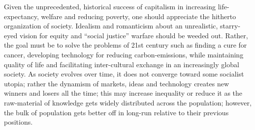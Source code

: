 \documentclass[12pt]{article}
\newcommand{\1}{\mathbbm 1}
\begin{document}
		Given the unprecedented, historical success of capitalism in increasing life-expectancy, welfare and reducing poverty, one should appreciate the hitherto organization of society. Idealism and romanticism about an unrealistic, starry-eyed vision for equity and ``social justice'' warfare should be weeded out. Rather, the goal must be to solve the problems of 21st century such as finding a cure for cancer, developing technology for reducing carbon-emissions, while maintaining quality of life and facilitating inter-cultural exchange in an increasingly global society. As society evolves over time, it does not converge toward some socialist utopia; rather the dynamism of markets, ideas and technology creates new winners and losers all the time; this may increase inequality or reduce it as the raw-material of knowledge gets widely distributed across the population; however, the bulk of population gets better off in long-run relative to their previous positions.
	
		\newpage
		
		

		\singlespacing
		
		
		\clearpage
		
		
		
		
		
		
		\newpage
		
		
		
		
		
		
		
		
		
		
		
		
		
		
		
	
\end{document}
